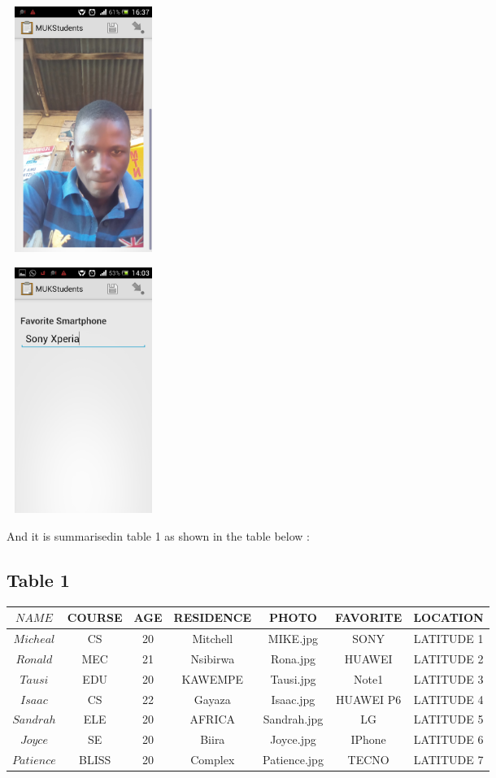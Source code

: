 \documentclass{article}
\begin{document}
\graphicspath{{ODKprojectReport/}}
\includegraphics[width = 5cm , height = 8cm ]{image}
\graphicspath{{ODKprojectReport/}}
\includegraphics[width = 5cm , height = 8cm ]{favoriteSmartphone}



And it is summarisedin table 1 as shown in the table below :
\subsection{Table 1}

\begin{tabular}{|c|c|c|c|c|c|c|}
	
	
\hline	$NAME$ & COURSE & AGE & RESIDENCE & PHOTO & FAVORITE & LOCATION \\ \hline
\hline	$ Micheal$ &  CS &20&Mitchell&MIKE.jpg&SONY &LATITUDE 1 \\ \hline
\hline	$ Ronald$ &  MEC &21&Nsibirwa&Rona.jpg&HUAWEI &LATITUDE 2 \\ \hline
\hline	$ Tausi$ &  EDU &20&KAWEMPE&Tausi.jpg&Note1 &LATITUDE 3\\ \hline
\hline	$ Isaac$ &  CS &22&Gayaza&Isaac.jpg&HUAWEI P6 &LATITUDE 4 \\ \hline
\hline	$ Sandrah$ &  ELE &20&AFRICA&Sandrah.jpg&LG &LATITUDE 5\\ \hline
\hline	$ Joyce$ &  SE &20&Biira&Joyce.jpg&IPhone &LATITUDE 6\\ \hline
\hline	$ Patience$ &  BLISS &20&Complex&Patience.jpg&TECNO &LATITUDE 7 \\ \hline

	
\end{tabular}
\end{document}
